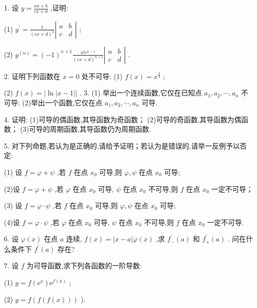 1. 设 \(y = \frac{{ax} + b}{{cx} + d}\) ,证明:

(1) \({y}^{\prime } = \frac{1}{{\left( cx + d\right) }^{2}}\left| \begin{array}{ll} a & b \\  c & d \end{array}\right|\) ;

(2) \({y}^{\left( n\right) } = {\left( -1\right) }^{n + 1}\frac{n!{c}^{n - 1}}{{\left( cx + d\right) }^{n + 1}}\left| \begin{matrix} a & b \\  c & d \end{matrix}\right|\) .

2. 证明下列函数在 \(x = 0\) 处不可导: (1) \(f\left( x\right)  = {x}^{\frac{2}{3}}\) ;

(2) \(f\left( x\right)  = \left| {\ln \left| {x - 1}\right| }\right|\) . 3. (1) 举出一个连续函数,它仅在已知点 \({a}_{1},{a}_{2},\cdots ,{a}_{n}\) 不可导; (2)举出一个函数,它仅在点 \({a}_{1},{a}_{2},\cdots ,{a}_{n}\) 可导.

4. 证明: (1)可导的偶函数,其导函数为奇函数； (2)可导的奇函数,其导函数为偶函数； (3)可导的周期函数,其导函数仍为周期函数.

5. 对下列命题,若认为是正确的,请给予证明；若认为是错误的,请举一反例予以否定:

(1) 设 \(f = \varphi  + \psi\) ,若 \(f\) 在点 \({x}_{0}\) 可导,则 \(\varphi ,\psi\) 在点 \({x}_{0}\) 可导;

(2)设 \(f = \varphi  + \psi\) ,若 \(\varphi\) 在点 \({x}_{0}\) 可导, \(\psi\) 在点 \({x}_{0}\) 不可导,则 \(f\) 在点 \({x}_{0}\) 一定不可导；

(3) 设 \(f = \varphi  \cdot  \psi\) ,若 \(f\) 在点 \({x}_{0}\) 可导,则 \(\varphi ,\psi\) 在点 \({x}_{0}\) 可导;

(4)设 \(f = \varphi  \cdot  \psi\) ,若 \(\varphi\) 在点 \({x}_{0}\) 可导, \(\psi\) 在点 \({x}_{0}\) 不可导,则 \(f\) 在点 \({x}_{0}\) 一定不可导.

6. 设 \(\varphi \left( x\right)\) 在点 \(a\) 连续, \(f\left( x\right)  = \left| {x - a}\right| \varphi \left( x\right)\) ,求 \({f}_{ - }^{\prime }\left( a\right)\) 和 \({f}_{ + }^{\prime }\left( a\right)\) . 问在什么条件下 \({f}^{\prime }\left( a\right)\) 存在?

7. 设 \(f\) 为可导函数,求下列各函数的一阶导数:

(1) \(y = f\left( {\mathrm{e}}^{x}\right) {\mathrm{e}}^{f\left( x\right) }\) ;

(2) \(y = f\left( {f\left( {f\left( x\right) }\right) }\right)\) ).


